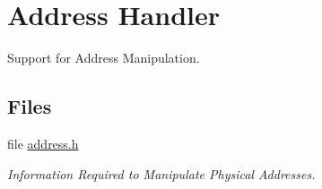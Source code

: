 \hypertarget{group__RTEMSScoreAddress}{}\section{Address Handler}
\label{group__RTEMSScoreAddress}


Support for Address Manipulation.  


\subsection*{Files}
\begin{DoxyCompactItemize}
\item 
file \mbox{\hyperlink{address_8h}{address.\+h}}
\begin{DoxyCompactList}\small\item\em Information Required to Manipulate Physical Addresses. \end{DoxyCompactList}\end{DoxyCompactItemize}
